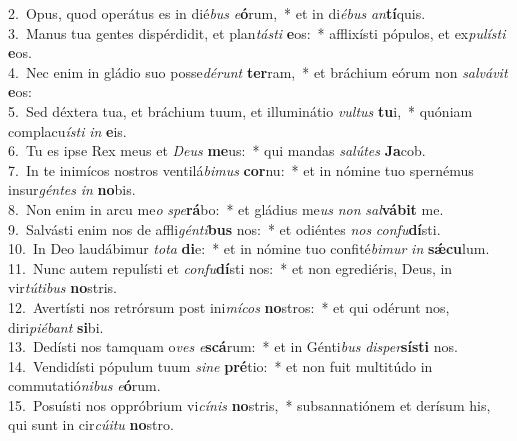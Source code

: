 {2.~}Opus, quod operátus es in dié\textit{bus} \textit{e}\textbf{ó}rum,~* et in di\textit{é}\textit{bus} \textit{an}\textbf{tí}quis.\\
{3.~}Manus tua gentes dispérdidit, et plan\textit{tá}\textit{sti} \textbf{e}os:~* afflixísti pópulos, et ex\textit{pu}\textit{lí}\textit{sti} \textbf{e}os.\\
{4.~}Nec enim in gládio suo posse\textit{dé}\textit{runt} \textbf{ter}ram,~* et bráchium eórum non \textit{sal}\textit{vá}\textit{vit} \textbf{e}os:\\
{5.~}Sed déxtera tua, et bráchium tuum, et illuminátio \textit{vul}\textit{tus} \textbf{tu}i,~* quóniam complacu\textit{í}\textit{sti} \textit{in} \textbf{e}is.\\
{6.~}Tu es ipse Rex meus et \textit{De}\textit{us} \textbf{me}us:~* qui mandas \textit{sa}\textit{lú}\textit{tes} \textbf{Ja}cob.\\
{7.~}In te inimícos nostros ventilá\textit{bi}\textit{mus} \textbf{cor}nu:~* et in nómine tuo spernémus insur\textit{gén}\textit{tes} \textit{in} \textbf{no}bis.\\
{8.~}Non enim in arcu me\textit{o} \textit{spe}\textbf{rá}bo:~* et gládius me\textit{us} \textit{non} \textit{sal}\textbf{vá}\textbf{bit} me.\\
{9.~}Salvásti enim nos de affli\textit{gén}\textit{ti}\textbf{bus} nos:~* et odiéntes \textit{nos} \textit{con}\textit{fu}\textbf{dí}sti.\\
{10.~}In Deo laudábimur \textit{to}\textit{ta} \textbf{di}e:~* et in nómine tuo confité\textit{bi}\textit{mur} \textit{in} \textbf{sǽ}\textbf{cu}lum.\\
{11.~}Nunc autem repulísti et \textit{con}\textit{fu}\textbf{dí}sti nos:~* et non egrediéris, Deus, in vir\textit{tú}\textit{ti}\textit{bus} \textbf{no}stris.\\
{12.~}Avertísti nos retrórsum post ini\textit{mí}\textit{cos} \textbf{no}stros:~* et qui odérunt nos, diri\textit{pi}\textit{é}\textit{bant} \textbf{si}bi.\\
{13.~}Dedísti nos tamquam o\textit{ves} \textit{e}\textbf{scá}rum:~* et in Génti\textit{bus} \textit{di}\textit{sper}\textbf{sí}\textbf{sti} nos.\\
{14.~}Vendidísti pópulum tuum \textit{si}\textit{ne} \textbf{pré}tio:~* et non fuit multitúdo in commutatió\textit{ni}\textit{bus} \textit{e}\textbf{ó}rum.\\
{15.~}Posuísti nos oppróbrium vi\textit{cí}\textit{nis} \textbf{no}stris,~* subsannatiónem et derísum his, qui sunt in cir\textit{cú}\textit{i}\textit{tu} \textbf{no}stro.\\
